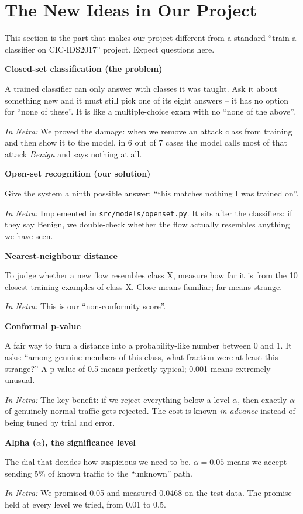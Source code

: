 \documentclass[11pt,a4paper]{article}
\newcommand{\term}[3]{%
  \par\medskip\noindent\textbf{\color{ink}#1}\par
  \nobreak\vspace{1pt}#2\par
  \nobreak\vspace{1pt}\textit{\color{accent}In Netra:} #3\par}
\begin{document}
\section{The New Ideas in Our Project}

\begin{saybox}
This section is the part that makes our project different from a standard
``train a classifier on CIC-IDS2017'' project. Expect questions here.
\end{saybox}

\term{Closed-set classification (the problem)}
{A trained classifier can only answer with classes it was taught. Ask it about
something new and it must still pick one of its eight answers -- it has no option
for ``none of these''. It is like a multiple-choice exam with no ``none of the
above''.}
{We proved the damage: when we remove an attack class from training and then show
it to the model, in 6 out of 7 cases the model calls most of that attack
\emph{Benign} and says nothing at all.}

\term{Open-set recognition (our solution)}
{Give the system a ninth possible answer: ``this matches nothing I was trained
on''.}
{Implemented in \texttt{src/models/openset.py}. It sits after the classifiers:
if they say Benign, we double-check whether the flow actually resembles anything
we have seen.}

\term{Nearest-neighbour distance}
{To judge whether a new flow resembles class X, measure how far it is from the
10 closest training examples of class X. Close means familiar; far means strange.}
{This is our ``non-conformity score''.}

\term{Conformal p-value}
{A fair way to turn a distance into a probability-like number between 0 and 1. It
asks: ``among genuine members of this class, what fraction were at least this
strange?'' A p-value of 0.5 means perfectly typical; 0.001 means extremely
unusual.}
{The key benefit: if we reject everything below a level $\alpha$, then exactly
$\alpha$ of genuinely normal traffic gets rejected. The cost is known \emph{in
advance} instead of being tuned by trial and error.}

\term{Alpha ($\alpha$), the significance level}
{The dial that decides how suspicious we need to be. $\alpha = 0.05$ means we
accept sending 5\% of known traffic to the ``unknown'' path.}
{We promised 0.05 and measured 0.0468 on the test data. The promise held at every
level we tried, from 0.01 to 0.5.}
\end{document}

